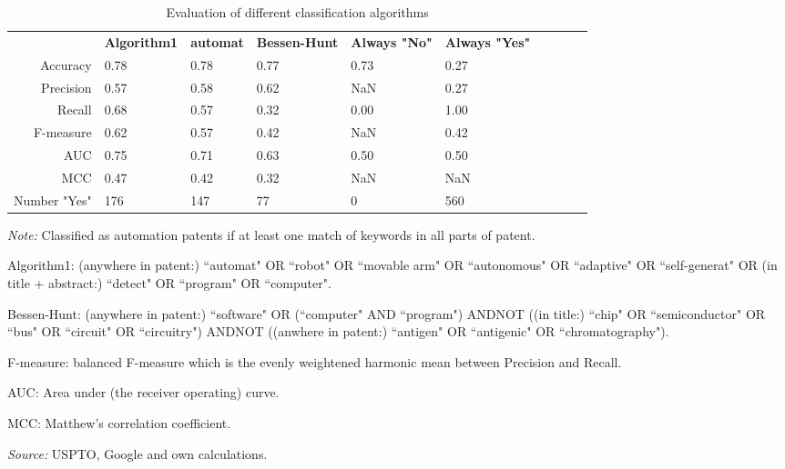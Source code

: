 \begin{table}
\begin{small}
\begin{threeparttable}
\caption{{\normalsize Evaluation of different classification algorithms}}
\label{table:table_compare_classalg}
\begin{tabular}{rlllllllll}
\toprule 
 & \textbf{Algorithm1} & \textbf{automat} & \textbf{Bessen-Hunt} & \textbf{Always "No"} & \textbf{Always "Yes"}  \tabularnewline 
Accuracy & 0.78 & 0.78 & 0.77 & 0.73 & 0.27 & & & &  \tabularnewline 
Precision & 0.57 & 0.58 & 0.62 & NaN & 0.27 & & & &  \tabularnewline 
Recall & 0.68 & 0.57 & 0.32 & 0.00 & 1.00 & & & &  \tabularnewline 
F-measure & 0.62 & 0.57 & 0.42 & NaN & 0.42 & & & &  \tabularnewline 
AUC & 0.75 & 0.71 & 0.63 & 0.50 & 0.50 & & & &  \tabularnewline 
MCC & 0.47 & 0.42 & 0.32 & NaN & NaN & & & &  \tabularnewline 
Number "Yes" & 176 & 147 & 77 & 0 & 560 & & & &  \tabularnewline 
\bottomrule 
\end{tabular} 
\begin{tablenotes}
\small
\item\textit{Note:} Classified as automation patents if at least one match of keywords in all parts of patent. \item Algorithm1: (anywhere in patent:) ``automat" OR ``robot" OR ``movable arm" OR ``autonomous" OR  ``adaptive" OR ``self-generat" OR (in title + abstract:) ``detect" OR ``program" OR ``computer".
\item Bessen-Hunt: (anywhere in patent:) ``software" OR (``computer" AND ``program") ANDNOT ((in title:) ``chip" OR ``semiconductor" OR ``bus" OR ``circuit" OR ``circuitry") ANDNOT ((anwhere in patent:) ``antigen" OR ``antigenic" OR ``chromatography").
\item F-measure: balanced F-measure which is the evenly weightened harmonic mean between Precision and Recall. 
\item AUC: Area under (the receiver operating) curve.
\item MCC: Matthew's correlation coefficient.
\item\textit{Source:} USPTO, Google and own calculations.
\end{tablenotes}
\end{threeparttable}
\end{small}
\end{table}
